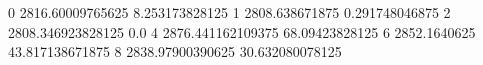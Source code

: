 0 2816.60009765625 8.253173828125
1 2808.638671875 0.291748046875
2 2808.346923828125 0.0
4 2876.441162109375 68.09423828125
6 2852.1640625 43.817138671875
8 2838.97900390625 30.632080078125

